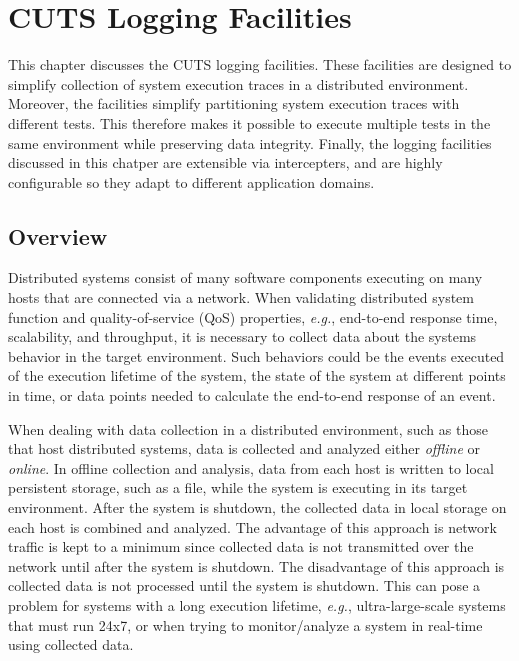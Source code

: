 
\chapter{CUTS Logging Facilities}
\label{chap:logging}

This chapter discusses the CUTS logging facilities. These facilities
are designed to simplify collection of system execution traces in 
a distributed environment. Moreover, the facilities simplify partitioning
system execution traces with different tests. This therefore makes it
possible to execute multiple tests in the same environment while 
preserving data integrity. Finally, the logging facilities discussed in
this chatper are extensible via intercepters, and are highly configurable 
so they adapt to different application domains.

\section{Overview}
\label{sec:logging-overview}

Distributed systems consist of many software components executing on
many hosts that are connected via a network. When validating distributed
system function and quality-of-service (QoS) properties, \textit{e.g.},
end-to-end response time, scalability, and throughput, it is necessary
to collect data about the systems behavior in the target environment.
Such behaviors could be the events executed of the execution lifetime of
the system, the state of the system at different points in time, or data 
points needed to calculate the end-to-end response of an event.

When dealing with data collection in a distributed environment, such 
as those that host distributed systems, data is collected and analyzed
either \textit{offline} or \textit{online}. In offline collection and 
analysis, data from each host is written to local persistent storage, 
such as a file, while the system is executing in its target environment. 
After the system is shutdown, the collected data in local storage on each 
host is combined and analyzed. The advantage of this approach is network 
traffic is kept to a minimum since collected data is not transmitted over
the network until after the system is shutdown. The disadvantage of this 
approach is collected data is not processed until the system is shutdown.
This can pose a problem for systems with a long execution lifetime, 
\textit{e.g.}, ultra-large-scale systems that must run 24x7, or when 
trying to monitor/analyze a system in real-time using collected data.


